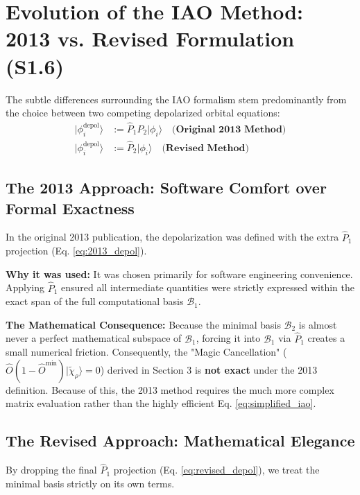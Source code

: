 \documentclass[11pt]{article}
\newcommand{\mnote}[1]{\marginpar{\linespread{1.1}\footnotesize\textsf{\textcolor{blue}{\textbf{Margin Note:} #1}}}}
\begin{document}
\vspace{0.5cm}

\section{Evolution of the IAO Method: 2013 vs. Revised Formulation (S1.6)}

The subtle differences surrounding the IAO formalism stem predominantly from the choice between two competing depolarized orbital equations:
\begin{align}
    |\phi_i^{\text{depol}}\rangle &:= \hat{P}_1\hat{P}_2|\phi_i\rangle \quad \textbf{(Original 2013 Method)} \label{eq:2013_depol} \\
    |\phi_i^{\text{depol}}\rangle &:= \hat{P}_2|\phi_i\rangle \quad \textbf{(Revised Method)} \label{eq:revised_depol}
\end{align}

\subsection{The 2013 Approach: Software Comfort over Formal Exactness}
In the original 2013 publication, the depolarization was defined with the extra $\hat{P}_1$ projection (Eq. \ref{eq:2013_depol}). 


\textbf{Why it was used:} It was chosen primarily for software engineering convenience. Applying $\hat{P}_1$ ensured all intermediate quantities were strictly expressed within the exact span of the full computational basis $\mathcal{B}_1$. 

\textbf{The Mathematical Consequence:} Because the minimal basis $\mathcal{B}_2$ is almost never a perfect mathematical subspace of $\mathcal{B}_1$, forcing it into $\mathcal{B}_1$ via $\hat{P}_1$ creates a small numerical friction. Consequently, the "Magic Cancellation" ($\hat{O}(1-\hat{O}^{\text{min}}) |\tilde{\chi}_\rho\rangle = 0$) derived in Section 3 is \textbf{not exact} under the 2013 definition. Because of this, the 2013 method requires the much more complex matrix evaluation rather than the highly efficient Eq. \ref{eq:simplified_iao}.

\subsection{The Revised Approach: Mathematical Elegance}
By dropping the final $\hat{P}_1$ projection (Eq. \ref{eq:revised_depol}), we treat the minimal basis strictly on its own terms. 
\end{document}
